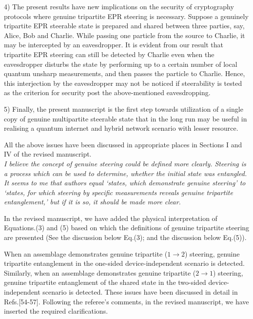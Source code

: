 \documentclass[12pt,showpacs,bibnotes,prl,onecolumn]{revtex4}
\newcommand{\red}{\color[rgb]{0.8,0,0}}
\newcommand{\blue}{\color[rgb]{0,0,0.6}}
\begin{document}
4) The present results have new implications on the security of  cryptography protocols where genuine tripartite EPR steering is necessary. Suppose a  genuinely tripartite EPR steerable state is prepared and shared between three parties, say, Alice, Bob and Charlie. While passing one particle from the source to Charlie, it may be intercepted by an eavesdropper. It is evident from our result that tripartite EPR steering can still be detected by Charlie even when the eavesdropper disturbs the state by performing up to a certain number of local quantum unsharp measurements, and then passes the particle to Charlie. Hence, this interjection by the eavesdropper may not be noticed if steerability is tested as the criterion for security post the above-mentioned eavesdropping.

5) Finally, the present manuscript is the first step towards utilization of a single copy of genuine multipartite steerable state that in the long run may be useful in realising a quantum internet and hybrid network scenario with lesser resource.

All the above issues have been discussed in appropriate places in Sections I and IV of the revised manuscript. \\



{\red{\bf{Referee's Comment:}}} \textit{I believe the concept of genuine steering could be defined more clearly. Steering is a process which can be used to determine, whether the initial state was entangled. It seems to me that authors equal `states, which demonstrate genuine steering' to `states, for which
steering by specific measurements reveals genuine tripartite entanglement,' but if it is so, it should be made more clear.}

{\blue{\bf{Author's Response:}}} In the revised manuscript, we have added the physical interpretation of Equations.(3) and (5) based on which the definitions of genuine tripartite steering are presented (See the discussion below Eq.(3); and the discussion below Eq.(5)). 

When an assemblage demonstrates genuine tripartite ($1 \rightarrow 2$) steering,  genuine tripartite entanglement in the one-sided device-independent scenario is detected. Similarly, when an assemblage demonstrates genuine tripartite ($2 \rightarrow 1$) steering,  genuine tripartite entanglement of the shared state in the two-sided device-independent scenario is detected. These issues have been discussed in detail in Refs.[54-57]. Following the referee's comments, in the revised manuscript, we have inserted
the required clarifications.  \\
\end{document}
